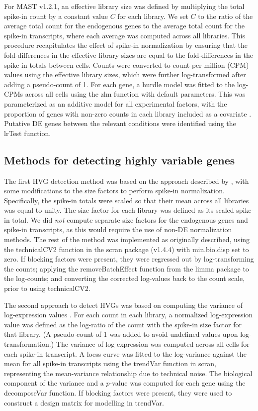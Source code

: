 \documentclass{article}
\begin{document}
For MAST v1.2.1, an effective library size was defined by multiplying the total spike-in count by a constant value $C$ for each library.
We set $C$ to the ratio of the average total count for the endogenous genes to the average total count for the spike-in transcripts, where each average was computed across all libraries.
This procedure recapitulates the effect of spike-in normalization by ensuring that the fold-differences in the effective library sizes are equal to the fold-differences in the spike-in totals between cells.
Counts were converted to count-per-million (CPM) values using the effective library sizes, which were further log-transformed after adding a pseudo-count of 1.
For each gene, a hurdle model was fitted to the log-CPMs across all cells using the zlm function with default parameters.
This was parameterized as an additive model for all experimental factors, with the proportion of genes with non-zero counts in each library included as a covariate \citep{finak2015mast}.
Putative DE genes between the relevant conditions were identified using the lrTest function.

\subsection{Methods for detecting highly variable genes}
The first HVG detection method was based on the approach described by \citet{brennecke2013accounting}, with some modifications to the size factors to perform spike-in normalization.
Specifically, the spike-in totals were scaled so that their mean across all libraries was equal to unity.
The size factor for each library was defined as its scaled spike-in total.
We did \textit{not} compute separate size factors for the endogenous genes and spike-in transcripts, as this would require the use of non-DE normalization methods.
The rest of the method was implemented as originally described, using the technicalCV2 function in the scran package (v1.4.4) with min.bio.disp set to zero.
If blocking factors were present, they were regressed out by log-transforming the counts; applying the removeBatchEffect function from the limma package \citep{ritchie2015limma} to the log-counts; and converting the corrected log-values back to the count scale, prior to using technicalCV2.

The second approach to detect HVGs was based on computing the variance of log-expression values \citep{lun2016stepbystep}.
For each count in each library, a normalized log-expression value was defined as the log-ratio of the count with the spike-in size factor for that library.
(A pseudo-count of 1 was added to avoid undefined values upon log-transformation.)
The variance of log-expression was computed across all cells for each spike-in transcript.
A loess curve was fitted to the log-variance against the mean for all spike-in transcripts using the trendVar function in scran, representing the mean-variance relationship due to technical noise.
The biological component of the variance and a $p$-value was computed for each gene using the decomposeVar function.
If blocking factors were present, they were used to construct a design matrix for modelling in trendVar.
\end{document}
